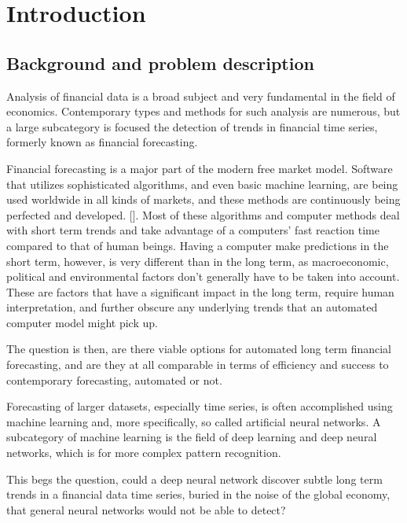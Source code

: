 \section{Introduction}

\subsection{Background and problem description}


Analysis of financial data is a broad subject and very fundamental in the field of economics. Contemporary types and methods for such analysis are numerous, but a large subcategory is focused the detection of trends in financial time series, formerly known as financial forecasting.

Financial forecasting is a major part of the modern free market model. Software that utilizes sophisticated algorithms, and even basic machine learning, are being used worldwide in all kinds of markets, and these methods are continuously being perfected and developed. []. Most of these algorithms and computer methods deal with short term trends and take advantage of a computers' fast reaction time compared to that of human beings. Having a computer make predictions in the short term, however, is very different than in the long term, as macroeconomic, political and environmental factors don't generally have to be taken into account. These are factors that have a significant impact in the long term, require human interpretation, and further obscure any underlying trends that an automated computer model might pick up.

The question is then, are there viable options for automated long term financial forecasting, and are they at all comparable in terms of efficiency and success to contemporary forecasting, automated or not.

Forecasting of larger datasets, especially time series, is often accomplished using machine learning and, more specifically, so called artificial neural networks. A subcategory of machine learning is the field of deep learning and deep neural networks, which is for more complex pattern recognition.

This begs the question, could a deep neural network discover subtle long term trends in a financial data time series, buried in the noise of the global economy, that general neural networks would not be able to detect?


